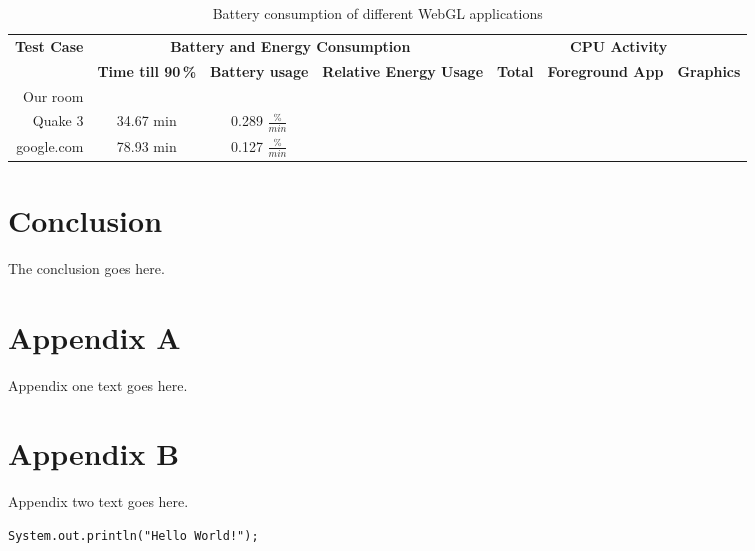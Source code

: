 \documentclass[12pt,journal,compsoc]{IEEEtran}
\begin{document}
\begin{table*}[tb]
	\begin{centering}
	\begin{tabular}{r|c|c|c|c|c|c}
		\multirow{2}{*}{\textbf{Test Case}} & \multicolumn{3}{c|}{\textbf{Battery and Energy Consumption}}						 & \multicolumn{3}{c}{\textbf{CPU Activity}}					\\
 							&\textbf{Time till 90\,\%} & \textbf{Battery usage}	& \textbf{Relative Energy Usage} & \textbf{Total} 	& \textbf{Foreground App} 		& \textbf{Graphics}	\\
		\hline
		Our room		   &							&							&								&					&								&					\\
		Quake 3			   &	34.67 min				& 0.289 $\frac{\%}{min}$	&								&					&								&					\\
		google.com		   &	78.93 min				& 0.127	$\frac{\%}{min}$	&								&					&								&					\\
	\end{tabular}
	\caption{Battery consumption of different WebGL applications\label{batteryTable}}
	\end{centering}
\end{table*}

\section{Conclusion}
The conclusion goes here.





\appendices
\section*{Appendix A}

Appendix one text goes here.

\section*{Appendix B}
Appendix two text goes here.

\begin{lstlisting}[label=code:hello_world, caption={Hello World Code Snippet}]
System.out.println("Hello World!");
\end{lstlisting}

\ifCLASSOPTIONcaptionsoff
  \newpage
\fi





\end{document}

